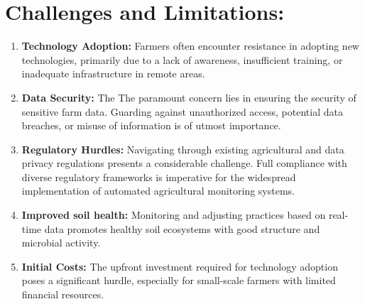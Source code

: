 \documentclass{article}
\begin{document}
\section{Challenges and Limitations:}
\begin{enumerate}
\item \textbf{Technology Adoption:} Farmers often encounter resistance in adopting new technologies, primarily due to a lack of awareness, insufficient training, or inadequate infrastructure in remote areas.
\item\textbf{Data Security:} The The paramount concern lies in ensuring the security of sensitive farm data. Guarding against unauthorized access, potential data breaches, or misuse of information is of utmost importance.
\item\textbf{ Regulatory Hurdles:} Navigating through existing agricultural and data privacy regulations presents a considerable challenge. Full compliance with diverse regulatory frameworks is imperative for the widespread implementation of automated agricultural monitoring systems.
\item\textbf{Improved soil health:} Monitoring and adjusting practices based on real-time data promotes healthy soil 
ecosystems with good structure and microbial activity.
\item\textbf{Initial Costs:} The upfront investment required for technology adoption poses a significant hurdle, especially for small-scale farmers with limited financial resources.
\newpage

\end{enumerate}
\end{document}
